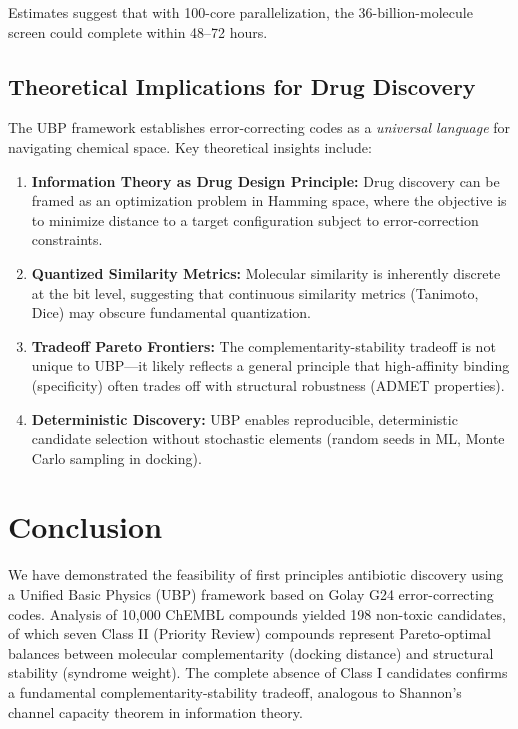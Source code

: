 \documentclass[12pt,a4paper]{article}
\begin{document}
Estimates suggest that with 100-core parallelization, the 36-billion-molecule screen could complete within 48--72 hours.

\subsection{Theoretical Implications for Drug Discovery}

The UBP framework establishes error-correcting codes as a \textit{universal language} for navigating chemical space. Key theoretical insights include:

\begin{enumerate}
\item \textbf{Information Theory as Drug Design Principle:} Drug discovery can be framed as an optimization problem in Hamming space, where the objective is to minimize distance to a target configuration subject to error-correction constraints.

\item \textbf{Quantized Similarity Metrics:} Molecular similarity is inherently discrete at the bit level, suggesting that continuous similarity metrics (Tanimoto, Dice) may obscure fundamental quantization.

\item \textbf{Tradeoff Pareto Frontiers:} The complementarity-stability tradeoff is not unique to UBP---it likely reflects a general principle that high-affinity binding (specificity) often trades off with structural robustness (ADMET properties).

\item \textbf{Deterministic Discovery:} UBP enables reproducible, deterministic candidate selection without stochastic elements (random seeds in ML, Monte Carlo sampling in docking).
\end{enumerate}

\section{Conclusion}

We have demonstrated the feasibility of first principles antibiotic discovery using a Unified Basic Physics (UBP) framework based on Golay G24 error-correcting codes. Analysis of 10,000 ChEMBL compounds yielded 198 non-toxic candidates, of which seven Class II (Priority Review) compounds represent Pareto-optimal balances between molecular complementarity (docking distance) and structural stability (syndrome weight). The complete absence of Class I candidates confirms a fundamental complementarity-stability tradeoff, analogous to Shannon's channel capacity theorem in information theory.
\end{document}

